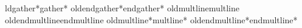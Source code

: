 {\renewenvironment{gather}%
     {\linenomath\csname oldgather\endcsname}%
     {\csname oldendgather\endcsname\endlinenomath}%
\expandafter\let\csname oldgather*\expandafter\endcsname\csname gather*\endcsname
\expandafter\let\csname oldendgather*\expandafter\endcsname\csname endgather*\endcsname
\renewenvironment{gather*}%
     {\linenomath\csname oldgather*\endcsname}%
     {\csname oldendgather*\endcsname\endlinenomath}%
%
\expandafter\let\csname oldmultline\expandafter\endcsname\csname multline\endcsname
\expandafter\let\csname oldendmultline\expandafter\endcsname\csname endmultline\endcsname
\renewenvironment{multline}%
     {\linenomath\csname oldmultline\endcsname}%
     {\csname oldendmultline\endcsname\endlinenomath}%
\expandafter\let\csname oldmultline*\expandafter\endcsname\csname multline*\endcsname
\expandafter\let\csname oldendmultline*\expandafter\endcsname\csname endmultline*\endcsname
\renewenvironment{multline*}%
     {\linenomath\csname oldmultline*\endcsname}%
     {\csname oldendmultline*\endcsname\endlinenomath}%
}
\linenumbers
